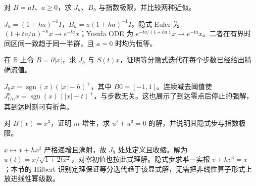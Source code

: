 \begin{exercise}[线性情形的核对]\label{ex:y14-linear-euler}
对 $B=aI$、$a\ge0$，求 $J_h$、$B_h$ 与指数极限，并比较两种近似。
\end{exercise}
\begin{solution}
$J_h=(1+ha)^{-1}I$，$B_h=a(1+ha)^{-1}I$。隐式 Euler 为 $(1+ta/n)^{-n}x\to e^{-ta}x$；Yosida ODE 为 $e^{-ta/(1+ha)}x\to e^{-ta}x$。二者在有界时间区间一致趋于同一半群，且 $a=0$ 时均为恒等。
\end{solution}

\begin{exercise}[软阈值与精确迭代]\label{ex:y14-soft-threshold}
在 $\mathbb R$ 上令 $B=\partial|x|$，求 $J_h$ 与 $S(t)x$，证明等分隐式迭代在每个步数已经给出精确流值。
\end{exercise}
\begin{solution}
$J_hx=\operatorname{sgn}(x)(|x|-h)^+$，其中 $B0=[-1,1]$。连续减去阈值使 $J_{t/n}^nx=\operatorname{sgn}(x)(|x|-t)^+$，与步数无关。这也展示了到达零点后停止的强解，其到达时刻可有折角。
\end{solution}

\begin{exercise}[非线性标量流]\label{ex:y14-cubic-flow}
对 $B(x)=x^3$，证明 $m$-增生，求 $u'+u^3=0$ 的解，并说明其隐式步与指数极限。
\end{exercise}
\begin{solution}
$x\mapsto x+hx^3$ 严格递增且满射，故 $J_h$ 处处定义且收缩。解为 $u(t)=x/\sqrt{1+2tx^2}$，对零初值也按此式理解。隐式步求唯一实根 $v+hv^3=x$；本节的 Hilbert 识别定理保证等分迭代趋于该显式解，无需把非线性算子形式上放进线性幂级数。
\end{solution}
